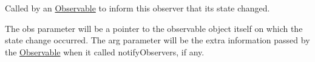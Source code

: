 Called by an \mbox{\hyperlink{classObservable}{Observable}} to inform this observer that its state changed. 

The \textquotesingle{}obs\textquotesingle{} parameter will be a pointer to the observable object itself on which the state change occurred. The \textquotesingle{}arg\textquotesingle{} parameter will be the extra information passed by the \mbox{\hyperlink{classObservable}{Observable}} when it called notify\+Observers, if any. 